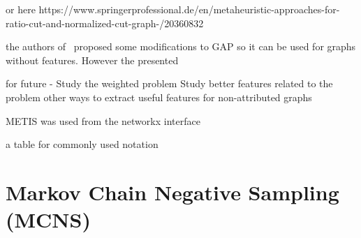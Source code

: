 or here https://www.springerprofessional.de/en/metaheuristic-approaches-for-ratio-cut-and-normalized-cut-graph-/20360832    

the authors of~\cite{gap2} proposed some modifications to GAP so it can be used for graphs without features. However the presented 

for future - Study the weighted problem
Study better features related to the problem
other ways to extract useful features for non-attributed graphs

METIS was used from the networkx interface

a table for commonly used notation



\section{Markov Chain Negative Sampling (MCNS)}

